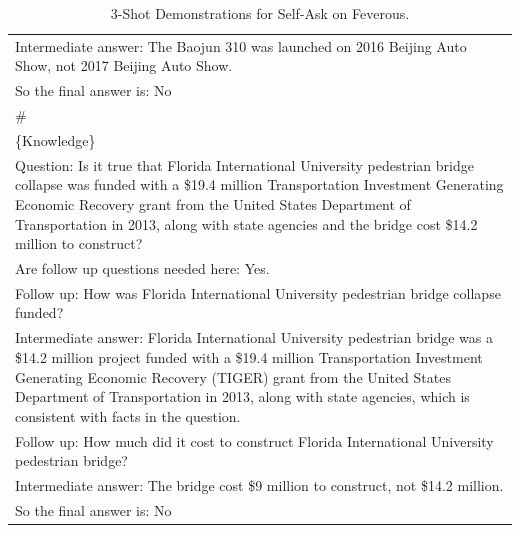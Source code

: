\begin{table}[t!]
{\begin{tabular}{p{\textwidth}}
Intermediate answer: The Baojun 310 was launched on 2016 Beijing Auto Show, not 2017 Beijing Auto Show.\\
So the final answer is: No\\
\#\\
\{Knowledge\}\\
Question: Is it true that Florida International University pedestrian bridge collapse was funded with a \$19.4 million Transportation Investment Generating Economic Recovery grant from the United States Department of Transportation in 2013, along with state agencies and the bridge cost \$14.2 million to construct?\\
Are follow up questions needed here: Yes.\\
Follow up: How was Florida International University pedestrian bridge collapse funded?\\
Intermediate answer: Florida International University pedestrian bridge was a \$14.2 million project funded with a \$19.4 million Transportation Investment Generating Economic Recovery (TIGER) grant from the United States Department of Transportation in 2013, along with state agencies, which is consistent with facts in the question.\\
Follow up: How much did it cost to construct Florida International University pedestrian bridge?\\
Intermediate answer: The bridge cost \$9 million to construct, not \$14.2 million.\\
So the final answer is: No\\
\bottomrule
\end{tabular}
}
\caption{3-Shot Demonstrations for Self-Ask on Feverous.}\label{tab:Feverous-self-ask}
\end{table}
\endgroup

